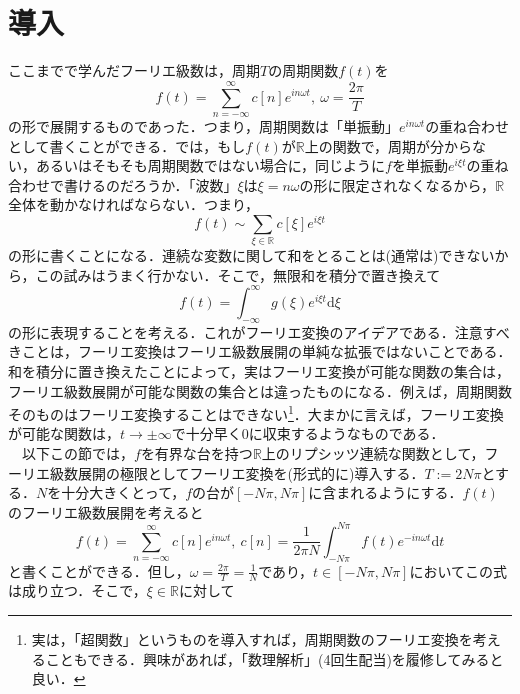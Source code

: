 \documentclass[a4j]{jsbook}
\numberwithin{theorem}{chapter}  %
\begin{document}
\section{導入} \label{sec3-1}
ここまでで学んだフーリエ級数は，周期\(T\)の周期関数\(f(t)\)を
\begin{equation*}
    f(t)=\sum_{n=-\infty}^\infty c[n]e^{in\omega t},\ \omega=\frac{2\pi}{T}
\end{equation*}
の形で展開するものであった．つまり，周期関数は「単振動」\(e^{in\omega t}\)の重ね合わせとして書くことができる．では，もし\(f(t)\)が\(\mathbb{R}\)上の関数で，周期が分からない，あるいはそもそも周期関数ではない場合に，同じように\(f\)を単振動\(e^{i\xi t}\)の重ね合わせで書けるのだろうか．「波数」\(\xi\)は\(\xi=n\omega\)の形に限定されなくなるから，\(\mathbb{R}\)全体を動かなければならない．つまり，
\begin{equation*}
    f(t)\sim\sum_{\xi\in\mathbb{R}}c[\xi]e^{i\xi t}
\end{equation*}
の形に書くことになる．連続な変数に関して和をとることは(通常は)できないから，この試みはうまく行かない．そこで，無限和を積分で置き換えて
\begin{equation*}
    f(t)=\int_{-\infty}^\infty g(\xi)e^{i\xi t}\mathrm{d}\xi
\end{equation*}
の形に表現することを考える．これがフーリエ変換のアイデアである．注意すべきことは，フーリエ変換はフーリエ級数展開の単純な拡張ではないことである．和を積分に置き換えたことによって，実はフーリエ変換が可能な関数の集合は，フーリエ級数展開が可能な関数の集合とは違ったものになる．例えば，周期関数そのものはフーリエ変換することはできない\footnote{実は，「超関数」というものを導入すれば，周期関数のフーリエ変換を考えることもできる．興味があれば，「数理解析」(4回生配当)を履修してみると良い．}．大まかに言えば，フーリエ変換が可能な関数は，\(t\to\pm\infty\)で十分早く0に収束するようなものである．\\
　以下この節では，\(f\)を有界な台を持つ\(\mathbb{R}\)上のリプシッツ連続な関数として，フーリエ級数展開の極限としてフーリエ変換を(形式的に)導入する．\(T:=2N\pi\)とする．\(N\)を十分大きくとって，\(f\)の台が\([-N\pi, N\pi]\)に含まれるようにする．\(f(t)\)のフーリエ級数展開を考えると
\begin{equation*}
    f(t)=\sum_{n=-\infty}^\infty c[n]e^{in\omega t},\ c[n]=\frac{1}{2\pi N}\int_{-N\pi}^{N\pi}f(t)e^{-in\omega t}\mathrm{d}t
\end{equation*}
と書くことができる．但し，\(\displaystyle\omega=\frac{2\pi}{T}=\frac{1}{N}\)であり，\(t\in[-N\pi, N\pi]\)においてこの式は成り立つ．そこで，\(\xi\in\mathbb{R}\)に対して
\end{document}
